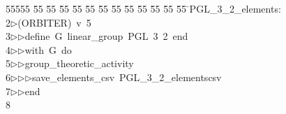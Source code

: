 %
%
\begin{tabbing}
55555 \= 55 \= 55 \= 55 \= 55 \= 55 \= 55 \= 55 \= 55 \= 55 \= 55 \= 55 \= 55 \= \>PGL\_3\_2\_elements:\\[0pt]
2\>$\triangleright$\>(ORBITER)\ v\ 5\ \\[0pt]
3\>$\triangleright$\>$\triangleright$\>define\ G\ linear\_group\ PGL\ 3\ 2\ end\ \\[0pt]
4\>$\triangleright$\>$\triangleright$\>with\ G\ do\ \\[0pt]
5\>$\triangleright$\>$\triangleright$\>group\_theoretic\_activity\ \\[0pt]
6\>$\triangleright$\>$\triangleright$\>$\triangleright$\>save\_elements\_csv\ PGL\_3\_2\_elementscsv\ \\[0pt]
7\>$\triangleright$\>$\triangleright$\>end\\[0pt]
8\>\end{tabbing}
